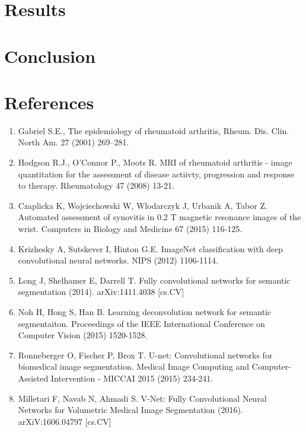 \documentclass[11pt]{article}
\begin{document}
\section{Results}
\section{Conclusion}

\newpage
\section*{References}
\begin{enumerate}

\item \label{gab} Gabriel S.E., The epidemiology of rheumatoid arthritis, Rheum. Dis. Clin. North
Am. 27 (2001) 269–281.

\item \label{hodge} Hodgson R.J., O'Connor P., Moots R. MRI of rheumatoid arthritis - image quantitation for the assessment of disease actiivty, progression and response to therapy. Rheumatology 47 (2008) 13-21. 

\item \label{cza} Czaplicka K, Wojciechowski W, Wlodarczyk J, Urbanik A, Tabor Z. Automated assessment of synovitis in 0.2 T magnetic resonance images of the wrist. Computers in Biology and Medicine 67 (2015) 116-125. 

\item \label{kriz} Krizhesky A, Sutskever I, Hinton G.E. ImageNet classification with deep convolutional neural networks. NIPS (2012) 1106-1114. 

\item \label{long} Long J, Shelhamer E, Darrell T. Fully convolutional networks for semantic segmentation (2014). arXiv:1411.4038 [cs.CV]

\item \label{noh} Noh H, Hong S, Han B. Learning deconvolution network for semantic segmentaiton. Proceedings of the IEEE International Conference on Computer Vision (2015) 1520-1528.

\item \label{unet} Ronneberger O, Fischer P, Brox T. U-net: Convolutional networks for biomedical image segmentation. Medical Image Computing and Computer-Assisted Intervention - MICCAI 2015 (2015) 234-241.

\item \label{vnet} Milletari F, Navab N, Ahmadi S. V-Net: Fully Convolutional Neural Networks for Volumetric Medical Image Segmentation (2016). arXiV:1606.04797 [cs.CV] 
\end{enumerate}
\end{document}
